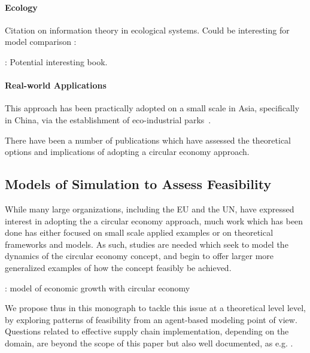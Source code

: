 \documentclass[fleqn,10pt]{wlscirep}
\begin{document}
\paragraph{Ecology}


Citation on information theory in ecological systems. Could be interesting for model comparison : \cite{ulanowicz1991ecosystem}

\cite{may1973stability} : Potential interesting book.





\paragraph{Real-world Applications}

This approach has been practically adopted on a small scale in Asia, specifically in China, via the establishment of eco-industrial parks~\cite{geng2013measuring}.

There have been a number of publications which have assessed the theoretical options and implications of adopting a circular economy approach. 




\subsection*{Models of Simulation to Assess Feasibility}


While many large organizations, including the EU and the UN,  have expressed interest in adopting the a circular economy approach, much work which has been done has either focused on small scale applied examples or on theoretical frameworks and models. As such, studies are needed which seek to model the dynamics of the circular economy concept, and begin to offer larger more generalized examples of how the concept feasibly be achieved. 


\cite{george2015circular} : model of economic growth with circular economy


We propose thus in this monograph to tackle this issue at a theoretical level level, by exploring patterns of feasibility from an agent-based modeling point of view. Questions related to effective supply chain implementation, depending on the domain, are beyond the scope of this paper but also well documented, as e.g. \cite{genovese2015sustainable}.
\end{document}
